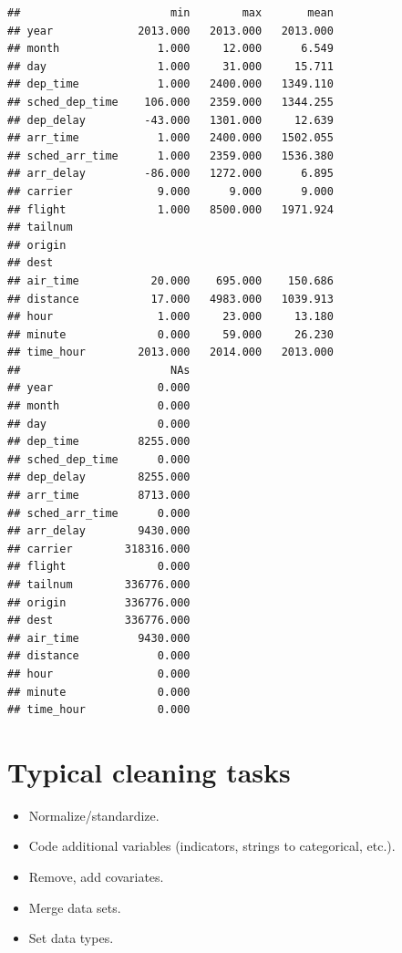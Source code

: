 \documentclass[
  12pt,
]{style/krantz}
\providecommand{\tightlist}{%
  \setlength{\itemsep}{0pt}\setlength{\parskip}{0pt}}
\begin{document}
\begin{verbatim}
##                       min        max       mean
## year             2013.000   2013.000   2013.000
## month               1.000     12.000      6.549
## day                 1.000     31.000     15.711
## dep_time            1.000   2400.000   1349.110
## sched_dep_time    106.000   2359.000   1344.255
## dep_delay         -43.000   1301.000     12.639
## arr_time            1.000   2400.000   1502.055
## sched_arr_time      1.000   2359.000   1536.380
## arr_delay         -86.000   1272.000      6.895
## carrier             9.000      9.000      9.000
## flight              1.000   8500.000   1971.924
## tailnum                                        
## origin                                         
## dest                                           
## air_time           20.000    695.000    150.686
## distance           17.000   4983.000   1039.913
## hour                1.000     23.000     13.180
## minute              0.000     59.000     26.230
## time_hour        2013.000   2014.000   2013.000
##                       NAs
## year                0.000
## month               0.000
## day                 0.000
## dep_time         8255.000
## sched_dep_time      0.000
## dep_delay        8255.000
## arr_time         8713.000
## sched_arr_time      0.000
## arr_delay        9430.000
## carrier        318316.000
## flight              0.000
## tailnum        336776.000
## origin         336776.000
## dest           336776.000
## air_time         9430.000
## distance            0.000
## hour                0.000
## minute              0.000
## time_hour           0.000
\end{verbatim}

\hypertarget{typical-cleaning-tasks}{%
\section{Typical cleaning tasks}\label{typical-cleaning-tasks}}

\begin{itemize}
\tightlist
\item
  Normalize/standardize.
\item
  Code additional variables (indicators, strings to categorical, etc.).
\item
  Remove, add covariates.
\item
  Merge data sets.
\item
  Set data types.
\end{itemize}
\end{document}
